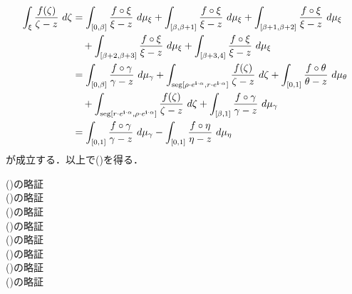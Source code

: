 	\begin{align}
		\int_{\xi} \frac{f(\zeta)}{\zeta - z}\ d\zeta
		&= \int_{[0,\beta]} \frac{f \circ \xi}{\xi - z}\ d\mu_{\xi} 
			+ \int_{[\beta,\beta+1]} \frac{f \circ \xi}{\xi - z}\ d\mu_{\xi}
			+ \int_{[\beta+1,\beta+2]} \frac{f \circ \xi}{\xi - z}\ d\mu_{\xi} \\
			&\quad + \int_{[\beta+2,\beta+3]} \frac{f \circ \xi}{\xi - z}\ d\mu_{\xi}
			+ \int_{[\beta+3,4]} \frac{f \circ \xi}{\xi - z}\ d\mu_{\xi} \\
		&= \int_{[0,\beta]} \frac{f \circ \gamma}{\gamma - z}\ d\mu_{\gamma} 
			+ \int_{\seg{\rho \cdot e^{\isym \cdot \alpha}}{r \cdot e^{\isym \cdot \alpha}}} \frac{f(\zeta)}{\zeta - z}\ d\zeta
			+ \int_{[0,1]} \frac{f \circ \theta}{\theta - z}\ d\mu_{\theta} \\
			&\quad + \int_{\seg{r \cdot e^{\isym \cdot \alpha}}{\rho \cdot e^{\isym \cdot \alpha}}} \frac{f(\zeta)}{\zeta - z}\ d\zeta
			+ \int_{[\beta,1]} \frac{f \circ \gamma}{\gamma - z}\ d\mu_{\gamma} \\
		&= \int_{[0,1]} \frac{f \circ \gamma}{\gamma - z}\ d\mu_{\gamma} - \int_{[0,1]} \frac{f \circ \eta}{\eta - z}\ d\mu_{\eta}
	\end{align}
	が成立する．以上で()を得る．
	
	\begin{description}
		\item[()の略証]
		\item[()の略証]
		\item[()の略証]
		\item[()の略証]
		\item[()の略証]
		\item[()の略証]
		\item[()の略証]
		\item[()の略証]
	\end{description}